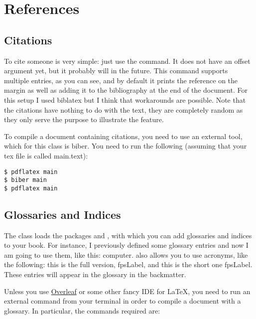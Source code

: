 \chapter{References}

\section{Citations}

To cite someone  is very simple: just 
use the  command. It does 
not have an offset argument yet, but it probably will in the future. 
This command supports multiple entries, as you can see, and by default 
it prints the reference on the margin as well as adding it to the 
bibliography at the end of the document. For this setup I used biblatex 
but I think that workarounds are possible. Note that 
the citations have nothing to do with the text, they are completely 
random as they only serve the purpose to illustrate the feature.

To compile a document containing citations, you need to use an external 
tool, which for this class is biber. You need to run the following 
(assuming that your tex file is called main.text):

\begin{lstlisting}[style=kaolstplain]
$ pdflatex main
$ biber main
$ pdflatex main
\end{lstlisting}

\section{Glossaries and Indices}

The  class loads the packages  and 
, with which you can add glossaries and indices to 
your book. For instance, I previously defined some glossary entries and 
now I am going to use them, like this: \gls{computer}. 
 also allows you to use acronyms, like the 
following: this is the full version, \acrfull{fpsLabel}, and this is the 
short one \acrshort{fpsLabel}. These entries will appear in the glossary 
in the backmatter.

Unless you use \href{https://www.overleaf.com}{Overleaf} or some other 
fancy IDE for \LaTeX, you need to run an external command from your 
terminal in order to compile a document with a glossary. In particular, 
the commands required are:

